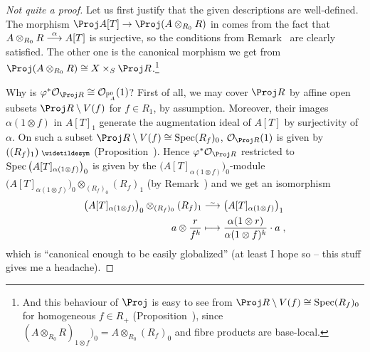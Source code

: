 \documentclass[a4paper,parskip=half,numbers=enddot, DIV=12]{scrreprt}
\begin{document}
\begin{proof}[Not quite a proof]
	Let us first justify that the given descriptions are well-defined. The morphism $\Proj A[T]\morphism \Proj(A\otimes_{R_0}R)$ in  comes from the fact that $A\otimes_{R_0}R\morphism[\alpha]A[T]$ is surjective, so the conditions from Remark~ are clearly satisfied. The other one is the canonical morphism we get from $\Proj(A\otimes_{R_0}R)\cong X\times_S\Proj R$.\footnote{And this behaviour of $\Proj$ is easy to see from $\Proj R\setminus V(f)\cong \Spec (R_f)_0$ for homogeneous $f\in R_+$ (Proposition~), since $(A\otimes_{R_0}R)_{1\otimes f})_0=A\otimes_{R_0}(R_f)_0$ and fibre products are base-local.} 
	
	Why is $\phi^*\Oo_{\Proj R}\cong \Oo_{\IP_A^0}(1)$? First of all, we may cover $\Proj R$ by affine open subsets $\Proj R\setminus V(f)$ for $f\in R_1$, by assumption. Moreover, their images $\alpha(1\otimes f)$ in $A[T]_1$ generate the augmentation ideal of $A[T]$ by surjectivity of $\alpha$. On such a subset $\Proj R\setminus V(f)\cong \Spec (R_f)_0$, $\Oo_{\Proj R}(1)$ is given by $((R_f)_1)^\qcmod$ (Proposition~). Hence $\phi^*\Oo_{\Proj R}$ restricted to $\operatorname{Spec} \big(A[T]_{\alpha(1\otimes f)}\big)_0$ is given by the $\big(A[T]_{\alpha(1\otimes f)}\big)_0$-module $\big(A[T]_{\alpha(1\otimes f)}\big)_0\otimes_{(R_f)_0}(R_f)_1$ (by Remark~) and we get an isomorphism
	\begin{align*}
		\big(A[T]_{\alpha(1\otimes f)}\big)_0\otimes_{(R_f)_0}(R_f)_1&\isomorphism \big(A[T]_{\alpha(1\otimes f)}\big)_1\\
		a \otimes \frac{r}{f^k}&\longmapsto \frac{\alpha(1\otimes r)}{\alpha(1\otimes f)^k}\cdot a\;,
	\end{align*}
	which is ``canonical enough to be easily globalized'' (at least I hope so -- this stuff gives me a headache).
	

\end{proof}
\end{document}
